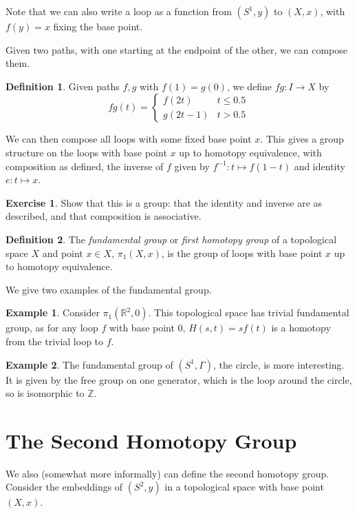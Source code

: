 \documentclass[a4paper,12pt]{article}
\newcommand{\ZZ}{\mathbb{Z}}
\newcommand{\RR}{\mathbb{R}}
\theoremstyle{definition}
\newtheorem*{defn}{Definition}
\newtheorem*{exer}{Exercise}
\newtheorem*{example}{Example}
\begin{document}
Note that we can also write a loop as a function from $(S^1, y)$ to $(X, x)$, with $f(y) = x$ fixing the base point.

Given two paths, with one starting at the endpoint of the other, we can compose them.

\begin{defn}
Given paths $f, g$ with $f(1) = g(0)$, we define $fg: I\to X$ by
$$fg(t) = \begin{cases}f(2t) & t\leq 0.5\\ g(2t-1) & t > 0.5\end{cases}$$
\end{defn}

We can then compose all loops with some fixed base point $x$.
This gives a group structure on the loops with base point $x$ up to homotopy equivalence, with composition as defined, the inverse of $f$ given by $f^{-1}: t\mapsto f(1-t)$ and identity $e: t\mapsto x$.

\begin{exer}
Show that this is a group: that the identity and inverse are as described, and that composition is associative.
\end{exer}

\begin{defn}
The \emph{fundamental group} or \emph{first homotopy group} of a topological space $X$ and point $x\in X$, $\pi_1(X, x)$, is the group of loops with base point $x$ up to homotopy equivalence.
\end{defn}

We give two examples of the fundamental group.

\begin{example}
Consider $\pi_1(\RR^2, 0)$.
This topological space has trivial fundamental group, as for any loop $f$ with base point 0, $H(s, t) = sf(t)$ is a homotopy from the trivial loop to $f$.
\end{example}

\begin{example}
The fundamental group of $(S^1, \Gamma)$, the circle, is more interesting.
It is given by the free group on one generator, which is the loop around the circle, so is isomorphic to $\ZZ$.
\end{example}

\section{The Second Homotopy Group}

We also (somewhat more informally) can define the second homotopy group.
Consider the embeddings of $(S^2, y)$ in a topological space with base point $(X, x)$.
\end{document}
